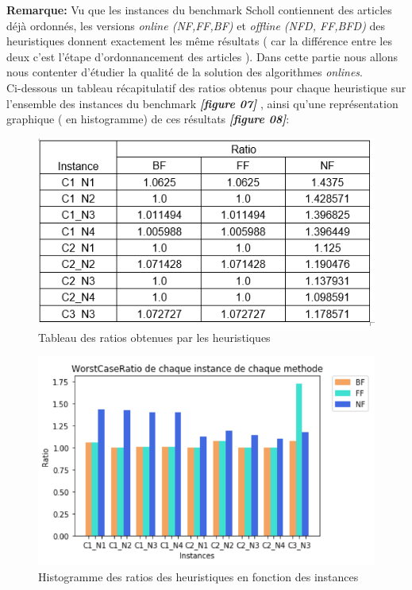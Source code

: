 \documentclass[class=article, crop=false]{standalone}
\begin{document}
\textbf{Remarque:} 
Vu que les instances du benchmark Scholl contiennent des articles déjà ordonnés, les versions \emph{online (NF,FF,BF)} et \emph{offline (NFD, \emph{FF},BFD)} des heuristiques donnent exactement les même résultats ( car la différence entre les deux c’est l’étape d’ordonnancement des articles ). Dans cette partie nous allons nous contenter d’étudier la qualité de la solution des algorithmes \emph{onlines}.\\

Ci-dessous un tableau récapitulatif des ratios obtenus pour chaque heuristique sur l’ensemble des instances du benchmark \textbf{\emph{[figure 07]}} , ainsi qu’une représentation graphique ( en histogramme) de ces résultats \textbf{\emph{[figure 08]}}:

\begin{figure}[H]
    \includegraphics[width=\linewidth]{../figures/tab_ratio_heur.png}
    \caption{Tableau des ratios obtenues par les heuristiques}
\end{figure}

\begin{figure}[H] 
    \includegraphics[width=\linewidth]{../figures/Ratio_M_heuristiques_intances.png}
    \caption{Histogramme des ratios des heuristiques en fonction des instances}
\end{figure}
\end{document}
